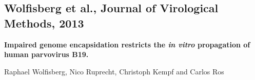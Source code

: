 


\pagestyle{empty}




\begin{center}
\setcounter{chapter}{0}
\chapter{Wolfisberg et al., Journal of Virological Methods, 2013}

\bigskip
\bigskip
\bigskip
\bigskip

\LARGE{\textbf{Impaired genome encapsidation restricts the \textit{in vitro} propagation of human parvovirus B19.}}

\bigskip
\bigskip
\bigskip

Raphael Wolfisberg, Nico Ruprecht, Christoph Kempf and Carlos Ros
\end{center}








